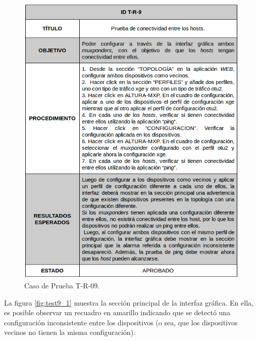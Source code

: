       \begin{figure}[H]
        \centering
        \includegraphics[scale=0.5]{Figures/test9.png}
        \caption{Caso de Prueba T-R-09.}
        \label{fig:test9}
      \end{figure}

      La figura \ref{fig:test9_1} muestra la sección principal de la interfaz gráfica. En ella, es posible observar un recuadro en amarillo indicando que se detectó una configuración inconsistente entre los dispositivos (o sea, que los dispositivos vecinos no tienen la misma configuración). 


